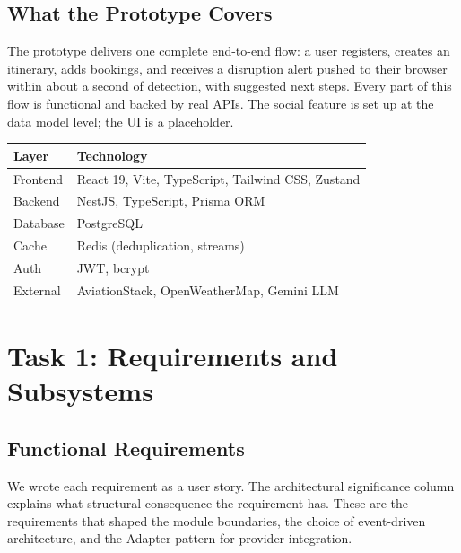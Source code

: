 \documentclass[12pt,a4paper]{article}
\begin{document}
\subsection*{What the Prototype Covers}

The prototype delivers one complete end-to-end flow: a user registers, creates an itinerary, adds
bookings, and receives a disruption alert pushed to their browser within about a second of
detection, with suggested next steps. Every part of this flow is functional and backed by real
APIs. The social feature is set up at the data model level; the UI is a placeholder.

\begin{tabular}{@{}ll@{}}
\toprule
\textbf{Layer} & \textbf{Technology} \\
\midrule
Frontend & React 19, Vite, TypeScript, Tailwind CSS, Zustand \\
Backend  & NestJS, TypeScript, Prisma ORM \\
Database & PostgreSQL \\
Cache    & Redis (deduplication, streams) \\
Auth     & JWT, bcrypt \\
External & AviationStack, OpenWeatherMap, Gemini LLM \\
\bottomrule
\end{tabular}

\section{Task 1: Requirements and Subsystems}

\subsection{Functional Requirements}

We wrote each requirement as a user story. The architectural significance column explains what
structural consequence the requirement has. These are the requirements that shaped the module
boundaries, the choice of event-driven architecture, and the Adapter pattern for provider
integration.
\end{document}
